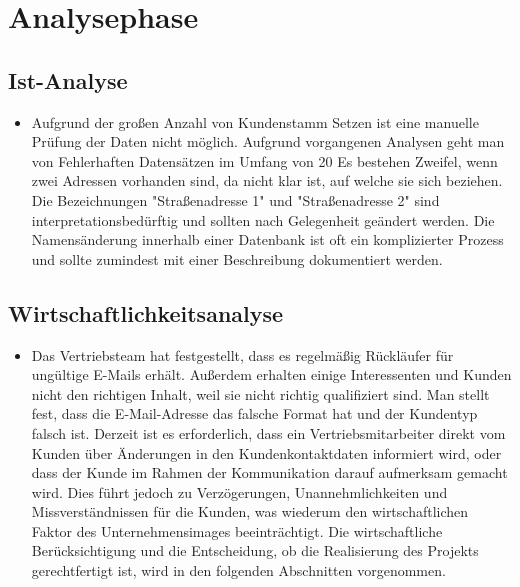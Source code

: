 \section{Analysephase} 
\label{sec:Analysephase}


\subsection{Ist-Analyse} 
\label{sec:IstAnalyse}
\begin{itemize}
	\item Aufgrund der großen Anzahl von Kundenstamm Setzen ist eine manuelle Prüfung der Daten nicht
	möglich. Aufgrund vorgangenen Analysen geht man von Fehlerhaften Datensätzen im Umfang von 20%
	Es bestehen Zweifel, wenn zwei Adressen vorhanden sind, da nicht klar ist, auf welche sie sich beziehen. 
	Die Bezeichnungen "Straßenadresse 1" und "Straßenadresse 2" sind interpretationsbedürftig und sollten nach Gelegenheit geändert werden. 
	Die Namensänderung innerhalb einer Datenbank ist oft ein komplizierter Prozess und sollte zumindest mit einer Beschreibung dokumentiert werden.
\end{itemize}


\subsection{Wirtschaftlichkeitsanalyse}
\label{sec:Wirtschaftlichkeitsanalyse}
\begin{itemize}
	\item Das Vertriebsteam hat festgestellt, dass es regelmäßig Rückläufer für ungültige E-Mails erhält. 
	Außerdem erhalten einige Interessenten und Kunden nicht den richtigen Inhalt, weil sie nicht richtig qualifiziert sind. 
	Man stellt fest, dass die E-Mail-Adresse das falsche Format hat und der Kundentyp falsch ist.
	Derzeit ist es erforderlich, dass ein Vertriebsmitarbeiter direkt vom Kunden über Änderungen in den Kundenkontaktdaten informiert wird, oder dass der Kunde im Rahmen der Kommunikation darauf aufmerksam gemacht wird.
	Dies führt jedoch zu Verzögerungen, Unannehmlichkeiten und Missverständnissen für die Kunden, was wiederum den wirtschaftlichen Faktor des Unternehmensimages beeinträchtigt.
	Die wirtschaftliche Berücksichtigung und die Entscheidung, ob die Realisierung des Projekts gerechtfertigt ist, wird in den folgenden Abschnitten vorgenommen.

\end{itemize}


